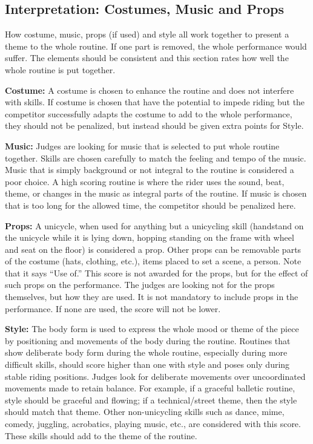 \subsection{Interpretation: Costumes, Music and Props}
How costume, music, props (if used) and style all work together to present a theme to the whole routine.
If one part is removed, the whole performance would suffer.
The elements should be consistent and this section rates how well the whole routine is put together.

\textbf{Costume:} A costume is chosen to enhance the routine and does not interfere with skills.
If costume is chosen that have the potential to impede riding but the competitor successfully adapts the costume to add to the whole performance, they should not be penalized, but instead should be given extra points for Style.

\textbf{Music:} Judges are looking for music that is selected to put whole routine together.
Skills are chosen carefully to match the feeling and tempo of the music.
Music that is simply background or not integral to the routine is considered a poor choice.
A high scoring routine is where the rider uses the sound, beat, theme, or changes in the music as integral parts of the routine.
If music is chosen that is too long for the allowed time, the competitor should be penalized here.

\textbf{Props:} A unicycle, when used for anything but a unicycling skill (handstand on the unicycle while it is lying down, hopping standing on the frame with wheel and seat on the floor) is considered a prop.
Other props can be removable parts of the costume (hats, clothing, etc.), items placed to set a scene, a person.
Note that it says ``Use of.'' This score is not awarded for the props, but for the effect of such props on the performance.
The judges are looking not for the props themselves, but how they are used.
It is not mandatory to include props in the performance.
If none are used, the score will not be lower.

\textbf{Style:} The body form is used to express the whole mood or theme of the piece by positioning and movements of the body during the routine.
Routines that show deliberate body form during the whole routine, especially during more difficult skills, should score higher than one with style and poses only during stable riding positions.
Judges look for deliberate movements over uncoordinated movements made to retain balance.
For example, if a graceful balletic routine, style should be graceful and flowing; if a technical/street theme, then the style should match that theme.
Other non-unicycling skills such as dance, mime, comedy, juggling, acrobatics, playing music, etc., are considered with this score.
These skills should add to the theme of the routine.

